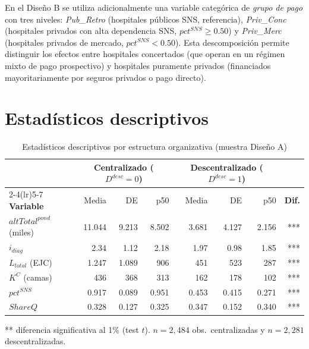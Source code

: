 En el Diseño B se utiliza adicionalmente una variable categórica de \textit{grupo de pago} con tres niveles: \textit{Pub\_Retro} (hospitales públicos SNS, referencia), \textit{Priv\_Conc} (hospitales privados con alta dependencia SNS, $pct^{SNS}\geq 0.50$) y \textit{Priv\_Merc} (hospitales privados de mercado, $pct^{SNS}<0.50$). Esta descomposición permite distinguir los efectos entre hospitales concertados (que operan en un régimen mixto de pago prospectivo) y hospitales puramente privados (financiados mayoritariamente por seguros privados o pago directo).

\section{Estadísticos descriptivos}

\begin{table}[htbp]
\centering
\caption{Estadísticos descriptivos por estructura organizativa (muestra Diseño A)}
\label{tab:descriptivos}
\begin{threeparttable}
\small
\begin{tabular}{lrrrrrrr}
\toprule
& \multicolumn{3}{c}{\textbf{Centralizado ($D^{desc}=0$)}}
& \multicolumn{3}{c}{\textbf{Descentralizado ($D^{desc}=1$)}} & \\
\cmidrule(lr){2-4}\cmidrule(lr){5-7}
\textbf{Variable} & Media & DE & p50
  & Media & DE & p50 & \textbf{Dif.} \\
\midrule
$altTotal^{pond}$ (miles) & 11.044 & 9.213 & 8.502
  & 3.681 & 4.127 & 2.156 & *** \\
$i_{diag}$ & 2.34 & 1.12 & 2.18
  & 1.97 & 0.98 & 1.85 & *** \\
$L_{total}$ (EJC) & 1.247 & 1.089 & 906
  & 451 & 523 & 287 & *** \\
$K^C$ (camas) & 436 & 368 & 313
  & 162 & 178 & 102 & *** \\
$pct^{SNS}$ & 0.917 & 0.089 & 0.951
  & 0.453 & 0.415 & 0.271 & *** \\
$ShareQ$ & 0.328 & 0.127 & 0.325
  & 0.347 & 0.152 & 0.340 & *** \\
\bottomrule
\end{tabular}
\begin{tablenotes}
  \small
  \item *** diferencia significativa al 1\% (test $t$). $n = 2{,}484$ obs.\ centralizadas y $n = 2{,}281$ descentralizadas.
\end{tablenotes}
\end{threeparttable}
\end{table}

